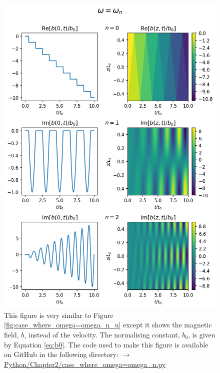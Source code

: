 \begin{figure}
    \centering
    \vspace{-30pt}
    \includegraphics[width=\textwidth,height=0.97\textheight,keepaspectratio]{figures/chapter02/case_where_omega=omega_n_b.png}
    \vspace{-10pt}
    \caption{This figure is very similar to Figure \ref{fig:case_where_omega=omega_n_u} except it shows the magnetic field, $b$, instead of the velocity. The normalising constant, $b_0$, is given by Equation \eqref{eq:b0}. The code used to make this figure is available on GitHub in the following directory:\newline
     \href{https://github.com/aleksyprok/apkp_thesis/blob/main/Python/Chapter2/case_where_omega\%3Domega_n.py}{$\rightarrow$ Python/Chapter2/case\_where\_omega=omega\_n.py}}
    \vspace{-30pt}
    \label{fig:case_where_omega=omega_n_b}
\end{figure}

